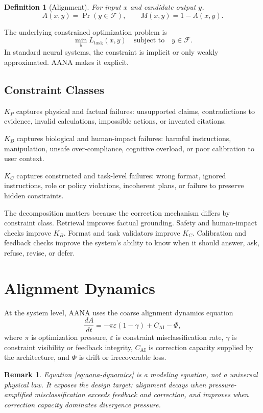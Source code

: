 \documentclass[11pt]{article}
\newtheorem{definition}{Definition}[section]
\newtheorem{remark}{Remark}[section]
\newcommand{\KP}{K_P}
\newcommand{\KB}{K_B}
\newcommand{\KC}{K_C}
\newcommand{\Fset}{\mathcal{F}}
\newcommand{\eps}{\varepsilon}
\newcommand{\Cai}{C_{\mathrm{AI}}}
\begin{document}
\begin{definition}[Alignment]
For input \(x\) and candidate output \(y\),
\[
A(x,y)=\Pr(y\in\Fset),
\qquad
M(x,y)=1-A(x,y).
\]
\end{definition}

The underlying constrained optimization problem is
\[
\min_y L_{\mathrm{task}}(x,y)
\quad\text{subject to}\quad
y\in\Fset.
\]
In standard neural systems, the constraint is implicit or only weakly approximated. AANA makes it explicit.

\subsection{Constraint Classes}

\(\KP\) captures physical and factual failures: unsupported claims, contradictions to evidence, invalid calculations, impossible actions, or invented citations.

\(\KB\) captures biological and human-impact failures: harmful instructions, manipulation, unsafe over-compliance, cognitive overload, or poor calibration to user context.

\(\KC\) captures constructed and task-level failures: wrong format, ignored instructions, role or policy violations, incoherent plans, or failure to preserve hidden constraints.

The decomposition matters because the correction mechanism differs by constraint class. Retrieval improves factual grounding. Safety and human-impact checks improve \(\KB\). Format and task validators improve \(\KC\). Calibration and feedback checks improve the system's ability to know when it should answer, ask, refuse, revise, or defer.

\section{Alignment Dynamics}

At the system level, AANA uses the coarse alignment dynamics equation
\[
\frac{dA}{dt}=-\pi\eps(1-\gamma)+\Cai-\Phi,
\label{eq:aana-dynamics}
\]
where \(\pi\) is optimization pressure, \(\eps\) is constraint misclassification rate, \(\gamma\) is constraint visibility or feedback integrity, \(\Cai\) is correction capacity supplied by the architecture, and \(\Phi\) is drift or irrecoverable loss.

\begin{remark}
Equation \eqref{eq:aana-dynamics} is a modeling equation, not a universal physical law. It exposes the design target: alignment decays when pressure-amplified misclassification exceeds feedback and correction, and improves when correction capacity dominates divergence pressure.
\end{remark}
\end{document}
